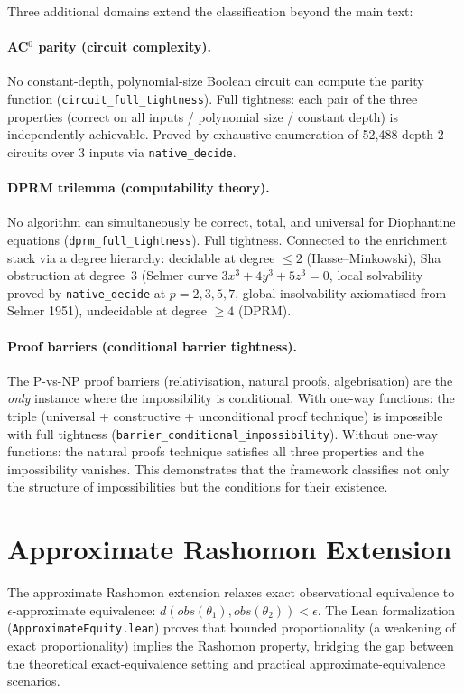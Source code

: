 \documentclass[11pt]{article}
\begin{document}
Three additional domains extend the classification beyond the main text:

\paragraph{AC$^0$ parity (circuit complexity).}
No constant-depth, polynomial-size Boolean circuit can compute the parity function (\texttt{circuit\_full\_tightness}).  Full tightness: each pair of the three properties (correct on all inputs / polynomial size / constant depth) is independently achievable.  Proved by exhaustive enumeration of 52{,}488 depth-2 circuits over 3 inputs via \texttt{native\_decide}.

\paragraph{DPRM trilemma (computability theory).}
No algorithm can simultaneously be correct, total, and universal for Diophantine equations (\texttt{dprm\_full\_tightness}).  Full tightness.  Connected to the enrichment stack via a degree hierarchy: decidable at degree $\leq 2$ (Hasse--Minkowski), Sha obstruction at degree~3 (Selmer curve $3x^3 + 4y^3 + 5z^3 = 0$, local solvability proved by \texttt{native\_decide} at $p = 2, 3, 5, 7$, global insolvability axiomatised from Selmer 1951), undecidable at degree $\geq 4$ (DPRM).

\paragraph{Proof barriers (conditional barrier tightness).}
The P-vs-NP proof barriers (relativisation, natural proofs, algebrisation) are the \emph{only} instance where the impossibility is conditional.  With one-way functions: the triple (universal + constructive + unconditional proof technique) is impossible with full tightness (\texttt{barrier\_conditional\_impossibility}).  Without one-way functions: the natural proofs technique satisfies all three properties and the impossibility vanishes.  This demonstrates that the framework classifies not only the structure of impossibilities but the conditions for their existence.

\section{Approximate Rashomon Extension}

The approximate Rashomon extension relaxes exact observational equivalence to $\epsilon$-approximate equivalence: $d(obs(\theta_1), obs(\theta_2)) < \epsilon$.  The Lean formalization (\texttt{ApproximateEquity.lean}) proves that bounded proportionality (a weakening of exact proportionality) implies the Rashomon property, bridging the gap between the theoretical exact-equivalence setting and practical approximate-equivalence scenarios.
\end{document}
